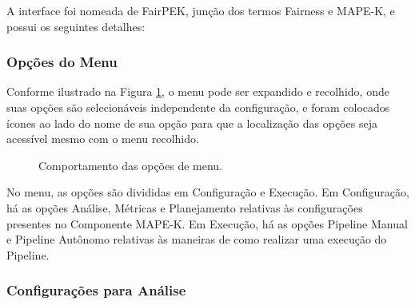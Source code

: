 \documentclass[portugues]{ic-tese}
\begin{document}
A interface foi nomeada de FairPEK, junção dos termos Fairness e MAPE-K, e possui os seguintes detalhes:

\subsubsection{Opções do Menu}

Conforme ilustrado na Figura \ref{fig:opcoesMenu}, o menu pode ser expandido e recolhido, onde suas opções são selecionáveis independente da configuração, e foram colocados ícones ao lado do nome de sua opção para que a localização das opções seja acessível mesmo com o menu recolhido.

\begin{figure}[H]
    \centering
    \caption{Comportamento das opções de menu.}
    \label{fig:opcoesMenu}
\end{figure}

No menu, as opções são divididas em Configuração e Execução. Em Configuração, há as opções Análise, Métricas e Planejamento relativas às configurações presentes no Componente MAPE-K. Em Execução, há as opções Pipeline Manual e Pipeline Autônomo relativas às maneiras de como realizar uma execução do Pipeline.

\subsubsection{Configurações para Análise}
\end{document}
